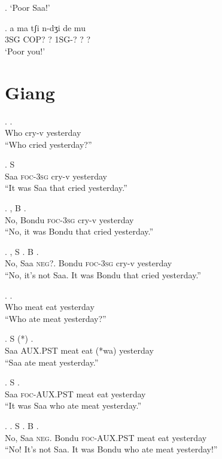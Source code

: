 \documentclass{assets/fieldnotes}
\begin{document}
\ex. `Poor Saa!'

\exg. a ma tʃi n-dʒi de mu \\
3SG COP? ? 1SG-? ? ?\\
`Poor you!'


\section{Giang}
\exg.   .\\
Who cry-v yesterday\\
``Who cried yesterday?''

\exg. S   \\
Saa \textsc{foc}-\textsc{3sg} cry-v yesterday\\
``It was Saa that cried yesterday.''

\exg. , B   .\\
No, Bondu \textsc{foc}-\textsc{3sg} cry-v yesterday\\
``No, it was Bondu that cried yesterday.''

\exg. , S . B   .\\
No, Saa \textsc{neg?}. Bondu \textsc{foc}-\textsc{3sg} cry-v yesterday\\
``No, it's not Saa. It was Bondu that cried yesterday.''

\exg.    .\\
Who meat eat yesterday\\
``Who ate meat yesterday?''

\exg. S    (*) .\\
Saa \textsc{AUX.PST} meat eat (*wa) yesterday\\
``Saa ate meat yesterday.''

\exg. S    .\\
Saa \textsc{foc-AUX.PST} meat eat yesterday\\
``It was Saa who ate meat yesterday.''

\exg. . S . B    .\\
No, Saa \textsc{neg}. Bondu \textsc{foc-AUX.PST} meat eat yesterday\\
``No! It's not Saa. It was Bondu who ate meat yesterday!''
\end{document}
